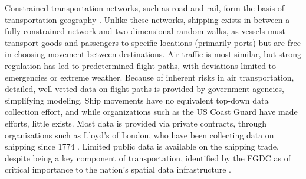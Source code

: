 Constrained transportation networks, such as road and rail, form the basis of transportation geography \cite{Rodrigue2009}. Unlike these networks, shipping exists in-between a fully constrained network%
 and two dimensional random walks,%
  as vessels must transport goods and passengers to specific locations (primarily ports) but are free in choosing movement between destinations. Air traffic is most similar, but strong regulation has led to predetermined flight paths, with deviations limited to emergencies or extreme weather. %
 Because of inherent risks in air transportation, detailed, well-vetted data on flight paths is provided by government agencies, %
simplifying modeling. Ship movements have no equivalent top-down data collection effort, and while organizations such as the US Coast Guard have made efforts, little exists. Most data is provided via private contracts, through organisations such as Lloyd's of London, who have been collecting data on shipping since 1774 \citep{Lloyd'sRegister-FairplayLtd.2010}. Limited public data is available on the shipping trade, despite being a key component of transportation, identified by the FGDC \citep{FGDC} as of critical importance to the nation's spatial data infrastructure \citep{CurrierInPress}.



